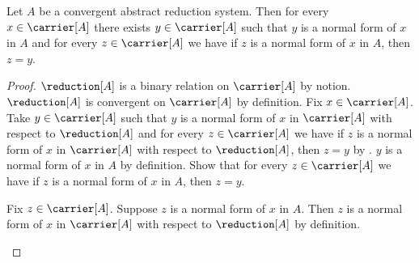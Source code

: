 \begin{theorem}\label{convergent_unique_normal_forms}
    Let $A$ be a convergent abstract reduction system.
    Then for every $x\in\carrier[A]$ there exists $y\in\carrier[A]$ such that
        $y$ is a normal form of $x$ in $A$ and
        for every $z\in\carrier[A]$ we have if
            $z$ is a normal form of $x$ in $A$, then $z=y$.
\end{theorem}
\begin{proof}
    $\reduction[A]$ is a binary relation on $\carrier[A]$ by notion.
    $\reduction[A]$ is convergent on $\carrier[A]$ by definition.
    Fix $x\in\carrier[A]$.
    Take $y\in\carrier[A]$ such that
        $y$ is a normal form of $x$ in $\carrier[A]$ with respect to
        $\reduction[A]$ and for every $z\in\carrier[A]$ we have if
        $z$ is a normal form of $x$ in $\carrier[A]$ with respect to
        $\reduction[A]$, then $z=y$
        by .
    $y$ is a normal form of $x$ in $A$ by definition.
    Show that for every $z\in\carrier[A]$ we have if
        $z$ is a normal form of $x$ in $A$, then $z=y$.
    \begin{subproof}
        Fix $z\in\carrier[A]$.
        Suppose $z$ is a normal form of $x$ in $A$.
        Then $z$ is a normal form of $x$ in $\carrier[A]$ with respect to
            $\reduction[A]$ by definition.
    \end{subproof}
\end{proof}
